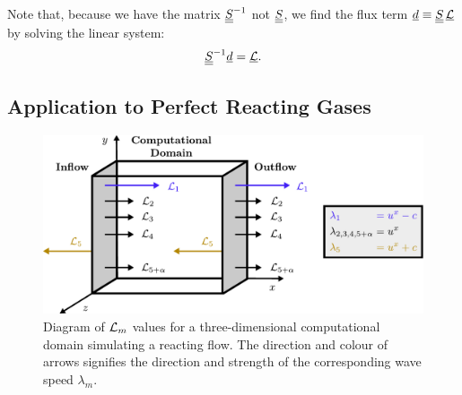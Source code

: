Note that, because we have the matrix $\underline{\underline{S}}^{-1}$ not $\underline{\underline{S}}$, we find the flux term $\underline{d} \equiv \underline{\underline{S}} \, \underline{\mathcal{L}}$ by solving the linear system:
\begin{equation}
\underline{\underline{S}}^{-1} \underline{d} = \underline{\mathcal{L}}.
\end{equation}




\subsection{Application to Perfect Reacting Gases}

\begin{figure}[t]
\centering
\includegraphics[scale=0.65]{assets/imgs/NSCBC-L.pdf}
\caption{Diagram of $\mathcal{L}_m$ values for a three-dimensional computational domain simulating a reacting flow. The direction and colour of arrows signifies the direction and strength of the corresponding wave speed $λ_m$.}
\label{fig:NSCBC}
\end{figure}

